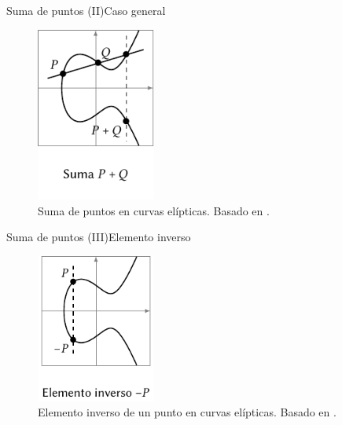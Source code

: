 \documentclass[spanish]{beamer}
\begin{document}
\begin{frame}{Suma de puntos (II)}{Caso general}
  \begin{figure}[h]
    \centering
    \includegraphics[width=0.35\textwidth]{img/suma-curvas}
    \caption{Suma de puntos en curvas elípticas. Basado en  \parencite{eichlseder_elliptic_2016}.}
    \label{fig:suma-curvas}
  \end{figure}  
\end{frame}

\begin{frame}{Suma de puntos (III)}{Elemento inverso}
  \begin{figure}[h]
    \centering
    \includegraphics[width=0.35\textwidth]{img/inverso-curvas}
    \caption{Elemento inverso de un punto en curvas elípticas. Basado en  \parencite{eichlseder_elliptic_2016}.}
    \label{fig:inverso-curvas}
  \end{figure}  
\end{frame}
\end{document}

